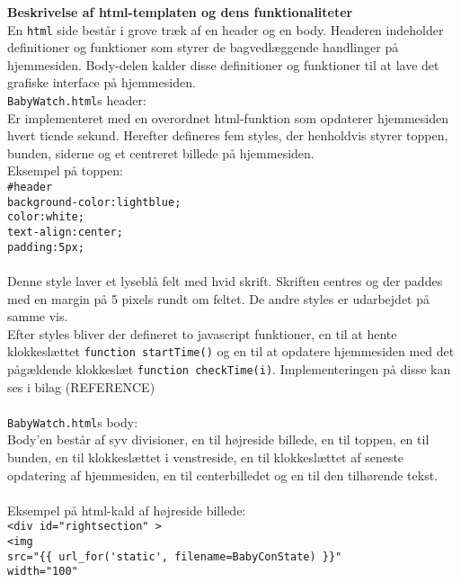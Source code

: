 \textbf{Beskrivelse af html-templaten og dens funktionaliteter} \\
En \verb+html+ side består i grove træk af en header og en body. Headeren indeholder definitioner og funktioner som styrer de bagvedlæggende handlinger på hjemmesiden. Body-delen kalder disse definitioner og funktioner til at lave det grafiske interface på hjemmesiden. 
\vspace{1mm} \\
\verb+BabyWatch.html+s header: \\ 
Er implementeret med en overordnet html-funktion som opdaterer hjemmesiden hvert tiende sekund. Herefter defineres fem styles, der henholdvis styrer toppen, bunden, siderne og et centreret billede på hjemmesiden. \\ Eksempel på toppen:  \\
\verb+#header+ \\
    \verb+background-color:lightblue;+\\
    \verb+color:white;+\\
    \verb+text-align:center;+\\
    \verb+padding:5px;+\\
\\Denne style laver et lyseblå felt med hvid skrift. Skriften centres og der paddes med en margin på 5 pixels rundt om feltet. De andre styles er udarbejdet på samme vis.\\
Efter styles bliver der defineret to javascript funktioner, en til at hente klokkeslættet \verb+function startTime()+ og en til at opdatere hjemmesiden med det pågældende klokkeslæt \verb+function checkTime(i)+. Implementeringen på disse kan ses i bilag (REFERENCE)\vspace{2mm}\\
\\ \verb+BabyWatch.html+s body: \\ 
Body'en består af syv divisioner, en til højreside billede, en til toppen, en til bunden, en til klokkeslættet i venstreside, en til klokkeslættet af seneste opdatering af hjemmesiden, en til centerbilledet og en til den tilhørende tekst.\\
\\Eksempel på html-kald af højreside billede: \\
\verb+<div id="rightsection" >+\\
\verb+<img +\\
\verb+src="{{ url_for('static', filename=BabyConState) }}"+\\
\verb+width="100"+\\
